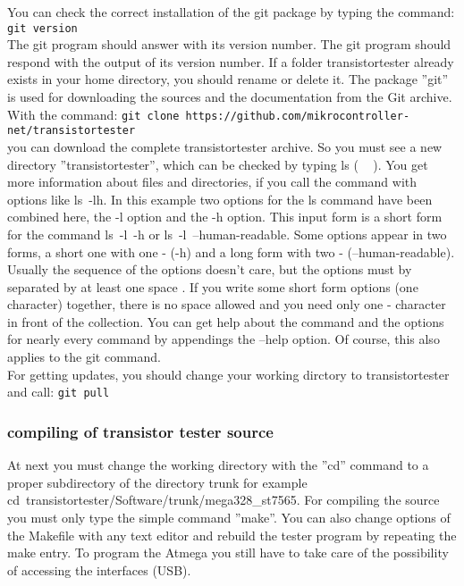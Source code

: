 You can check the correct installation of the git package by typing the command:
\verb"git version"\\
The git program should answer with its version number.
The git program should respond with the output of its version number.
If a folder transistortester already exists in your home directory,
you should rename or delete it.
The package ''git'' is used for downloading the sources and the documentation from the Git archive.
With the command:
\verb"git clone https://github.com/mikrocontroller-net/transistortester"\\
you can download the complete transistortester archive.
So you must see a new directory ''transistortester'', which can
be checked by typing ls ( \mbox{  \keys{\return}} ).
You get more information about files and directories, if you call
the command with options like \mbox{ls -lh}.
In this example two options for the ls command have been combined here,
the -l option and the -h option.
This input form is a short form for the command \mbox{ls -l -h} or \mbox{ls -l --human-readable}.
Some options appear in two forms, a short one with one - (-h) and a long form
with two - (--human-readable).
Usually the sequence of the options doesn't care, but the options must by separated
by at least one space \keys{\space}.
If you write some short form options (one character) together, there is no space allowed
and you need only one - character in front of the collection.
You can get help about the command and the options for nearly every command by appendings
the \mbox{--help} option.
Of course, this also applies to the git command.\\
For getting updates, you should change your working dirctory to transistortester and call:
\verb"git pull"

\subsubsection{compiling of transistor tester source}
At next you must change the working directory with the ''cd'' command to a proper
subdirectory of the directory trunk for example \mbox{cd transistortester/Software/trunk/mega328\_st7565}.
For compiling the source you must only type the simple command ''make''.
You can also change options of the Makefile with any text editor and rebuild the
tester program by repeating the make entry.
To program the Atmega you still have to take care of the possibility of accessing the interfaces (USB). 
